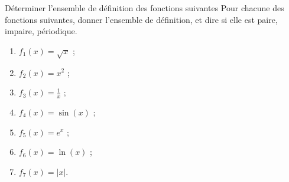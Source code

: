 
\begin{exercice}\label{exostarterST-0001}

Déterminer l'ensemble de définition des fonctions suivantes 
Pour chacune des fonctions suivantes, donner l'ensemble de définition, et dire si elle est paire, impaire, périodique.

\begin{multicols}{4}
\begin{enumerate}
\item $f_1(x) = \sqrt{x}$ ; 
\item $f_2(x) = x^2$ ;
\item $f_3(x) = \frac{1}{x}$ ; 
\item $f_4(x) = \sin(x)$ ;
\item $f_5(x) = e^x$ ;
\item $f_6(x) = \ln(x)$ ; 
\item $f_7(x) = |x|$.  
\end{enumerate}
\end{multicols}


\end{exercice}
